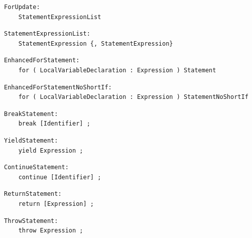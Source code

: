 \noindent\textbf{\texttt{}}\par
\begin{lstlisting}
ForUpdate:
    StatementExpressionList
\end{lstlisting}

\noindent\textbf{\texttt{}}\par
\begin{lstlisting}
StatementExpressionList:
    StatementExpression {, StatementExpression}
\end{lstlisting}

\noindent\textbf{\texttt{}}\par
\begin{lstlisting}
EnhancedForStatement:
    for ( LocalVariableDeclaration : Expression ) Statement
\end{lstlisting}

\noindent\textbf{\texttt{}}\par
\begin{lstlisting}
EnhancedForStatementNoShortIf:
    for ( LocalVariableDeclaration : Expression ) StatementNoShortIf
\end{lstlisting}

\noindent\textbf{\texttt{}}\par
\begin{lstlisting}
BreakStatement:
    break [Identifier] ;
\end{lstlisting}

\noindent\textbf{\texttt{}}\par
\begin{lstlisting}
YieldStatement:
    yield Expression ;
\end{lstlisting}

\noindent\textbf{\texttt{}}\par
\begin{lstlisting}
ContinueStatement:
    continue [Identifier] ;
\end{lstlisting}

\noindent\textbf{\texttt{}}\par
\begin{lstlisting}
ReturnStatement:
    return [Expression] ;
\end{lstlisting}

\noindent\textbf{\texttt{}}\par
\begin{lstlisting}
ThrowStatement:
    throw Expression ;
\end{lstlisting}

